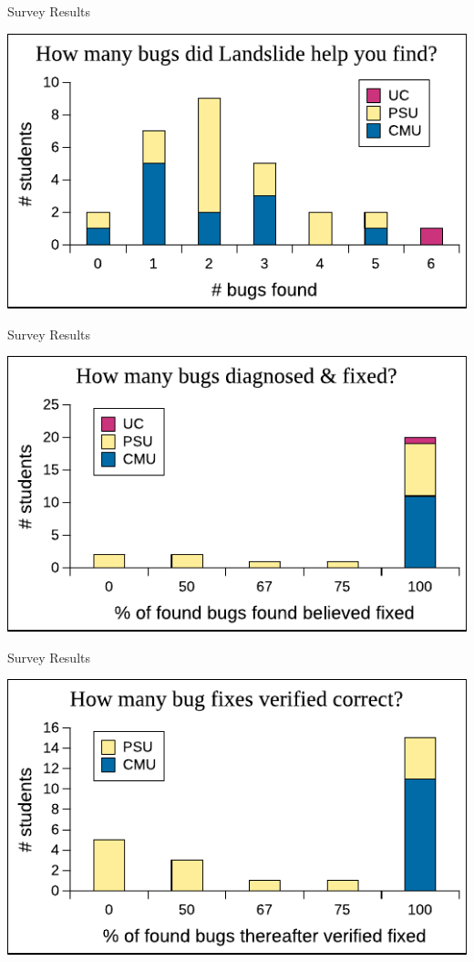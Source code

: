 \documentclass[xcolor=dvipsnames]{beamer}
\begin{document}
\begin{frame}{Survey Results} \begin{center} \includegraphics[width=\textwidth]{../survey1.pdf} \end{center} \end{frame}
\begin{frame}{Survey Results} \begin{center} \includegraphics[width=\textwidth]{../survey2.pdf} \end{center} \end{frame}
\begin{frame}{Survey Results} \begin{center} \includegraphics[width=\textwidth]{../survey3.pdf} \end{center} \end{frame}
\end{document}
